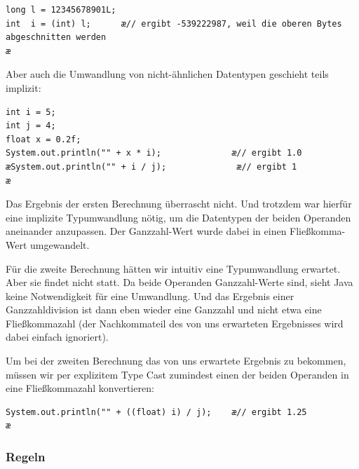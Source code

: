 \begin{lstlisting}
long l = 12345678901L;
int  i = (int) l;      æ// ergibt -539222987, weil die oberen Bytes abgeschnitten werden
æ\end{lstlisting}

Aber auch die Umwandlung von nicht-ähnlichen Datentypen geschieht teils
implizit:

\begin{lstlisting}
int i = 5;
int j = 4;
float x = 0.2f;
System.out.println("" + x * i);              æ// ergibt 1.0
æSystem.out.println("" + i / j);              æ// ergibt 1
æ\end{lstlisting}

Das Ergebnis der ersten Berechnung überrascht nicht. Und trotzdem war hierfür
eine implizite Typumwandlung nötig, um die Datentypen der beiden Operanden
aneinander anzupassen. Der Ganzzahl-Wert wurde dabei in einen Fließkomma-Wert
umgewandelt.

Für die zweite Berechnung hätten wir intuitiv eine Typumwandlung erwartet. Aber
sie findet nicht statt. Da beide Operanden Ganzzahl-Werte sind, sieht Java
keine Notwendigkeit für eine Umwandlung. Und das Ergebnis einer
Ganzzahldivision ist dann eben wieder eine Ganzzahl und nicht etwa eine
Fließkommazahl (der Nachkommateil des von uns erwarteten Ergebnisses wird dabei
einfach ignoriert).

Um bei der zweiten Berechnung das von uns erwartete Ergebnis zu bekommen, müssen
wir per explizitem Type Cast zumindest einen der beiden Operanden in eine
Fließkommazahl konvertieren:

\begin{lstlisting}
System.out.println("" + ((float) i) / j);    æ// ergibt 1.25
æ\end{lstlisting}

\subsubsection{Regeln}

